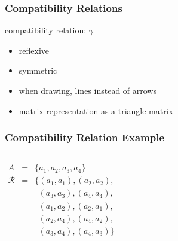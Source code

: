 \documentclass[dvipsnames]{beamer}
\begin{document}
\begin{frame}
  \frametitle{Compatibility Relations}

  \begin{definition}
    \alert{compatibility relation}: $\gamma$
    \begin{itemize}
      \item reflexive
      \item symmetric
    \end{itemize}
  \end{definition}

  \pause
  \begin{itemize}
    \item when drawing, lines instead of arrows
    \item matrix representation as a triangle matrix
  \end{itemize}
\end{frame}

\begin{frame}
  \frametitle{Compatibility Relation Example}

  \begin{columns}
    \begin{eqnarray*}
      A           & = & \{a_1,a_2,a_3,a_4\}\\
      \mathcal{R} & = & \{(a_1,a_1),(a_2,a_2),\\
                  &   & ~~(a_3,a_3),(a_4,a_4),\\
                  &   & ~~(a_1,a_2),(a_2,a_1),\\
                  &   & ~~(a_2,a_4),(a_4,a_2),\\
                  &   & ~~(a_3,a_4),(a_4,a_3)\}\\
    \end{eqnarray*}

    \begin{center}

      \bigskip
    \end{center}
  \end{columns}
\end{frame}
\end{document}
